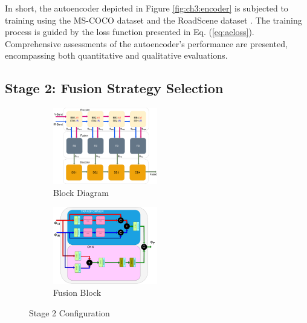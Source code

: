 In short, the autoencoder depicted in Figure \ref{fig:ch3:encoder} is subjected to training using the MS-COCO dataset \cite{lin2014microsoft} and the RoadScene dataset \cite{xu2020aaai}. The training process is guided by the loss function presented in Eq. (\ref{eq:aeloss}). Comprehensive assessments of the autoencoder's performance are presented, encompassing both quantitative and qualitative evaluations. 

\subsection{Stage 2: Fusion Strategy Selection} \label{subsec:fusion}

\begin{figure}[htbp]
    \centering
    \begin{subfigure}[b]{\textwidth}
        \includegraphics[width=0.5\textwidth]{imgs/stage2.pdf}
        \captionsetup{justification=raggedright,singlelinecheck=false}
        \caption{Block Diagram}
        \label{fig:ch3:stage2}
    \end{subfigure}
    \vspace{0.01cm}
    \begin{subfigure}[b]{\textwidth}
        \includegraphics[width=0.5\textwidth]{imgs/transformerblok.pdf}
        \captionsetup{justification=raggedright,singlelinecheck=false}
        \caption{Fusion Block}
        \label{fig:ch3:fusion}
    \end{subfigure}
    \caption{Stage 2 Configuration}
    \label{fig:ch3:stage2all}
\end{figure}

